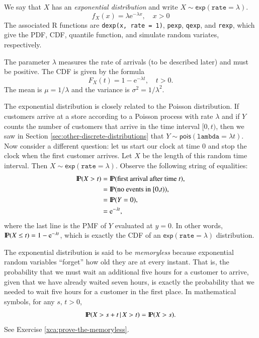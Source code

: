\documentclass[captions=tableheading]{scrbook}
\begin{document}
We say that \(X\) has an \emph{exponential distribution} and write \(X\sim\mathsf{exp}(\mathtt{rate}=\lambda)\). 
\begin{equation}
f_{X}(x)=\lambda\mathrm{e}^{-\lambda x},\quad x>0
\end{equation}
The associated \textsf{R} functions are \texttt{dexp(x, rate = 1)}, \texttt{pexp}, \texttt{qexp}, and \texttt{rexp}, which give the PDF, CDF, quantile function, and simulate random variates, respectively.

The parameter \(\lambda\) measures the rate of arrivals (to be described later) and must be positive. The CDF is given by the formula
\begin{equation}
F_{X}(t)=1-\mathrm{e}^{-\lambda t},\quad t>0.
\end{equation}
The mean is \(\mu=1/\lambda\) and the variance is \(\sigma^{2}=1/\lambda^{2}\). 

The exponential distribution is closely related to the Poisson distribution. If customers arrive at a store according to a Poisson process with rate \(\lambda\) and if \(Y\) counts the number of customers that arrive in the time interval \([0,t)\), then we saw in Section \ref{sec:other-discrete-distributions} that \( Y \sim \mathsf{pois}(\mathtt{lambda}=\lambda t). \) Now consider a different question: let us start our clock at time 0 and stop the clock when the first customer arrives. Let \(X\) be the length of this random time interval. Then \(X\sim\mathsf{exp}(\mathtt{rate}=\lambda)\). Observe the following string of equalities:
\begin{align*}
\P(X>t) & =\P(\mbox{first arrival after time \emph{t}}),\\
 & =\P(\mbox{no events in [0,\emph{t})}),\\
 & =\P(Y=0),\\
 & =\mathrm{e}^{-\lambda t},
\end{align*}
where the last line is the PMF of \(Y\) evaluated at \(y=0\). In other words, \(\P(X\leq t)=1-\mathrm{e}^{-\lambda t}\), which is exactly the CDF of an \(\mathsf{exp}(\mathtt{rate}=\lambda)\) distribution. 

The exponential distribution is said to be \emph{memoryless} because exponential random variables ``forget'' how old they are at every instant. That is, the probability that we must wait an additional five hours for a customer to arrive, given that we have already waited seven hours, is exactly the probability that we needed to wait five hours for a customer in the first place. In mathematical symbols, for any \(s,\, t>0\),
\begin{equation}
\P(X>s+t\,|\, X>t)=\P(X>s).
\end{equation}
See Exercise \ref{xca:prove-the-memoryless}.
\end{document}
